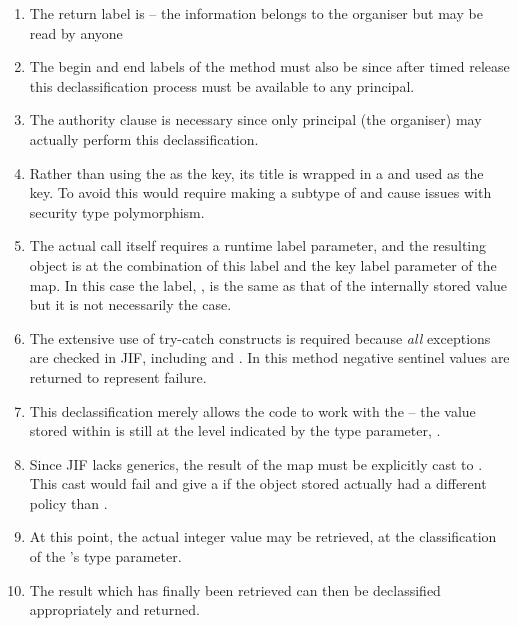 \begin{enumerate}
	\item The return label is  -- the information belongs to the organiser but may be read by anyone
	
	\item The begin and end labels of the method must also be  since after timed release this declassification process must be available to any principal.
	
	\item The authority clause is necessary since only principal  (the organiser) may actually perform this declassification.
	
	\item Rather than using the  as the key, its title is wrapped in a  and used as the key. To avoid this would require making  a subtype of  and cause issues with security type polymorphism.
	
	\item The actual  call itself requires a runtime label parameter, and the resulting object is at the combination of this label and the key label parameter of the map. In this case the label, , is the same as that of the internally stored value but it is not necessarily the case.
	
	\item The extensive use of try-catch constructs is required because \textit{all} exceptions are checked in JIF, including  and . In this method negative sentinel values are returned to represent failure.
	
	\item This declassification merely allows the code to work with the  -- the value stored within is still at the level indicated by the type parameter, .
	
	\item Since JIF lacks generics, the result of the map must be explicitly cast to . This cast would fail and give a  if the object stored actually had a different policy than .
	
	\item At this point, the actual integer value may be retrieved, at the classification of the 's type parameter.
	
	\item The result which has finally been retrieved can then be declassified appropriately and returned.
	
\end{enumerate}

